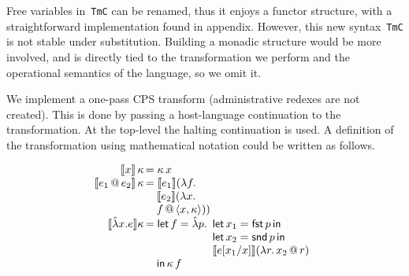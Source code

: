 \documentclass[9pt,preprint,authoryear]{sigplanconf}
\begin{document}
%
Free variables in{~}\textcolor[rgb]{0,0,0.80}{\texttt{TmC}} can be renamed, thus it enjoys a functor
    structure, with a straightforward implementation found in appendix.
    However, this new syntax{~}\textcolor[rgb]{0,0,0.80}{\texttt{TmC}} is not stable under substitution.
    Building a monadic structure would be more involved, and is directly
    tied to the transformation we perform and the operational semantics
    of the language, so we omit it.%


%
We implement a one-pass CPS transform (administrative redexes are
    not created). This is done by passing a host-language continuation
    to the transformation. At the top-level the halting continuation
    is used. A definition of the transformation using mathematical
    notation could be written as follows.%


\[ 
\begin{array}{r@{\,}l}
 \llbracket x \rrbracket\,\kappa &= \kappa\,x \\
 \llbracket e_1 \,@\, e_2 \rrbracket\,\kappa &= \llbracket e_1 \rrbracket (\lambda f. \\
                                       &\quad \llbracket e_2 \rrbracket (\lambda x. \\
                                       &\quad f \, @ \, \langle x, \kappa \rangle ) ) \\
 \llbracket \hat\lambda x. e \rrbracket \kappa &= \mathsf{let}\, f = \hat\lambda p. \begin{array}[t]{l}
                                       \mathsf{let}\, x_1 = \mathsf{fst}\, p \,\mathsf{in}\\
                                       \mathsf{let}\, x_2  = \mathsf{snd}\, p \,\mathsf{in} \\
                                       \llbracket e[x_1/x] \rrbracket (\lambda r.\, x_2 \, @ \, r) \end{array}  \\
                                      &\quad \mathsf{in} \, \kappa\,f
\end{array} \]
\end{document}
